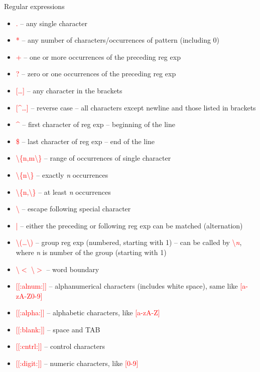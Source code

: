 \documentclass[compress, ucs, xelatex, 11pt, xcolor=svgnames,
  hyperref={
    bookmarks=true,
    unicode=true,
    colorlinks=true,
    pdftitle={Linux, command line and MetaCentrum},
    plainpages=false,
    pdfauthor={Vojtech Zeisek},
    pdfsubject={Course about use of Linux command line, writing shell scripts and using MetaCentrum of CESNET},
    pdfcreator={XeLaTeX},
    pdfkeywords={Linux, GNU, BASH, shell, command line, MetaCentrum},
    linkcolor=Red,
    anchorcolor=Blue,
    citecolor=Purple,
    filecolor=DodgerBlue,
    menucolor=DarkOrchid,
    urlcolor=DeepSkyBlue,
    pdftex},
  url={hyphens, lowtilde} %
  ]{beamer}
\renewcommand{\alert}[1]{\textcolor{red}{#1}}
\begin{document}
\begin{frame}[allowframebreaks]{Regular expressions}
\label{regexp}
\begin{itemize}
  \item \alert{.} -- any single character
  \item \alert{*} -- any number of characters/occurrences of pattern (including 0)
  \item \alert{+} -- one or more occurrences of the preceding reg exp
  \item \alert{?} -- zero or one occurrences of the preceding reg exp
  \item \alert{[\ldots]} -- any character in the brackets
  \item \alert{[\textasciicircum\ldots]} -- reverse case -- all characters except newline and those listed in brackets
  \item \alert{\textasciicircum} -- first character of reg exp -- beginning of the line
  \item \alert{\$} -- last character of reg exp -- end of the line
  \item \alert{\textbackslash\{n,m\textbackslash\}} -- range of occurrences of single character
  \item \alert{\textbackslash\{n\textbackslash\}} -- exactly \textit{n} occurrences
  \item \alert{\textbackslash\{n,\textbackslash\}} -- at least \textit{n} occurrences
  \item \alert{\textbackslash} -- escape following special character
  \item \alert{|} -- either the preceding or following reg exp can be matched (alternation)
  \item \alert{\textbackslash(\ldots\textbackslash)} -- group reg exp (numbered, starting with 1) -- can be called by \alert{\textbackslash\textit{n}}, where \textit{n} is number of the group (starting with 1)
  \item \alert{\textbackslash$<$ \textbackslash$>$} -- word boundary
  \item \alert{[[:alnum:]]} -- alphanumerical characters (includes white space), same like \alert{[a-zA-Z0-9]}
  \item \alert{[[:alpha:]]} -- alphabetic characters, like \alert{[a-zA-Z]}
  \item \alert{[[:blank:]]} -- space and TAB
  \item \alert{[[:cntrl:]]} -- control characters
  \item \alert{[[:digit:]]} -- numeric characters, like \alert{[0-9]}

\end{itemize}
\end{frame}
\end{document}
